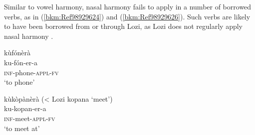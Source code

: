 Similar to vowel harmony, nasal harmony fails to apply in a number of borrowed verbs, as in (\ref{bkm:Ref98929624}) and (\ref{bkm:Ref98929626}). Such verbs are likely to have been borrowed from or through Lozi, as Lozi does not regularly apply nasal harmony \citep[141]{Gowlett1989}.

\ea
\label{bkm:Ref98929624}
\glll kùfónèrà\\
ku-fón-er-a\\
\textsc{inf}-phone-\textsc{appl}-\textsc{fv}\\
\glt ‘to phone’
\z

\ea
\label{bkm:Ref98929626}
kùkòpànèrà (< Lozi kopana ‘meet’)\\
ku-kopan-er-a\\
\textsc{inf}-meet-\textsc{appl}-\textsc{fv}\\
\glt ‘to meet at’
\z

